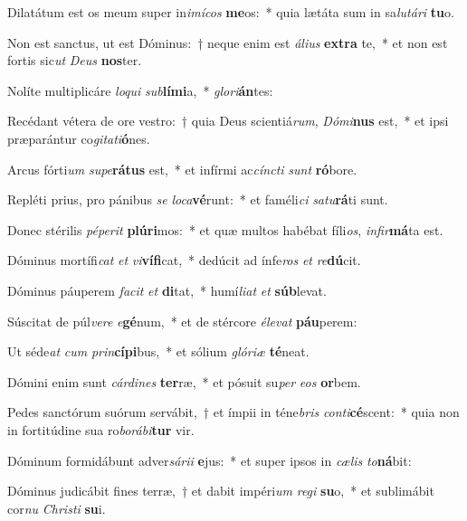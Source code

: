 \item Dilatátum est os meum super in\textit{i}\textit{mí}\textit{cos} \textbf{me}os:~* quia lætáta sum in sa\textit{lu}\textit{tá}\textit{ri} \textbf{tu}o.
\item Non est sanctus, ut est Dóminus:~† neque enim est \textit{á}\textit{li}\textit{us} \textbf{ex}\textbf{tra} te,~* et non est fortis sic\textit{ut} \textit{De}\textit{us} \textbf{nos}ter.
\item Nolíte multiplicáre \textit{lo}\textit{qui} \textit{sub}\textbf{lí}\textbf{mi}a,~* \textit{glo}\textit{ri}\textbf{án}tes:
\item Recédant vétera de ore vestro:~† quia Deus scientiá\textit{rum}, \textit{Dó}\textit{mi}\textbf{nus} est,~* et ipsi præparántur co\textit{gi}\textit{ta}\textit{ti}\textbf{ó}nes.
\item Arcus fórti\textit{um} \textit{su}\textit{pe}\textbf{rá}\textbf{tus} est,~* et infírmi ac\textit{cínc}\textit{ti} \textit{sunt} \textbf{ró}bore.
\item Repléti prius, pro pánibus \textit{se} \textit{lo}\textit{ca}\textbf{vé}runt:~* et faméli\textit{ci} \textit{sa}\textit{tu}\textbf{rá}ti sunt.
\item Donec stérilis \textit{pé}\textit{pe}\textit{rit} \textbf{plú}\textbf{ri}mos:~* et quæ multos habébat fíli\textit{os}, \textit{in}\textit{fir}\textbf{má}ta est.
\item Dóminus mortífi\textit{cat} \textit{et} \textit{vi}\textbf{ví}\textbf{fi}cat,~* dedúcit ad ínfe\textit{ros} \textit{et} \textit{re}\textbf{dú}cit.
\item Dóminus páuperem \textit{fa}\textit{cit} \textit{et} \textbf{di}tat,~* humí\textit{li}\textit{at} \textit{et} \textbf{súb}levat.
\item Súscitat de púl\textit{ve}\textit{re} \textit{e}\textbf{gé}num,~* et de stércore \textit{é}\textit{le}\textit{vat} \textbf{páu}perem:
\item Ut séde\textit{at} \textit{cum} \textit{prin}\textbf{cí}\textbf{pi}bus,~* et sólium \textit{gló}\textit{ri}\textit{æ} \textbf{té}neat.
\item Dómini enim sunt \textit{cár}\textit{di}\textit{nes} \textbf{ter}ræ,~* et pósuit su\textit{per} \textit{e}\textit{os} \textbf{or}bem.
\item Pedes sanctórum suórum servábit,~† et ímpii in téne\textit{bris} \textit{con}\textit{ti}\textbf{cé}scent:~* quia non in fortitúdine sua ro\textit{bo}\textit{rá}\textit{bi}\textbf{tur} vir.
\item Dóminum formidábunt adver\textit{sá}\textit{ri}\textit{i} \textbf{e}jus:~* et super ipsos in \textit{cæ}\textit{lis} \textit{to}\textbf{ná}bit:
\item Dóminus judicábit fines terræ,~† et dabit impéri\textit{um} \textit{re}\textit{gi} \textbf{su}o,~* et sublimábit cor\textit{nu} \textit{Chris}\textit{ti} \textbf{su}i.
